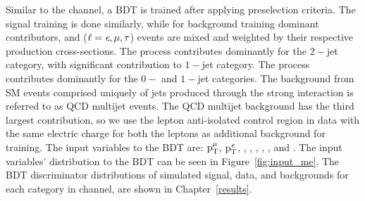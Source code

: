 Similar to the \muhad channel, a BDT is trained after applying preselection criteria. The signal training is done similarly, while for background training dominant contributors, \ttbar and \Zll ($\ell=\textit{e}, \mu, \tau$) events are mixed and weighted by their respective production cross-sections. The \ttbar process contributes dominantly for the $2-$jet category, with significant contribution to $1-$jet category. The \Zll process contributes dominantly for the $0-$ and $1-$jet categories. The background from SM events comprised uniquely of jets produced through the strong interaction is referred to as QCD multijet events. The QCD multijet background has the third largest contribution, so we use the lepton anti-isolated control region in data with the same electric charge for both the leptons as additional background for training. The input variables to the BDT are: $\text{p}_\text{T}^{\mu}$, $\text{p}_\text{T}^{\textit{e}}$, \mcol, \mtmmet, \mtemet, \dphiem, \dphimmet, and \dphiemet. The input variables' distribution to the BDT can be seen in Figure~\ref{fig:input_me}. The BDT discriminator distributions of simulated signal, data, and backgrounds for each category in \mue channel, are shown in Chapter~\ref{results}.

